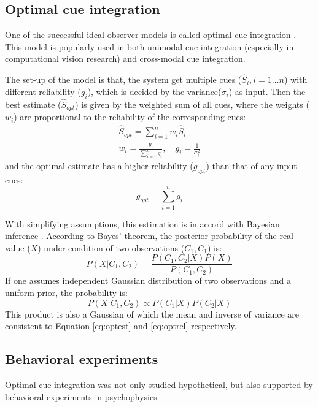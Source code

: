 \documentclass{article}[11pt]
\begin{document}
\subsection{Optimal cue integration}
One of the successful ideal observer models is called optimal cue integration \cite{geisler_contributions_2011}. This model is popularly used in both unimodal cue integration (especially in computational vision research) and cross-modal cue integration.

The set-up of the model is that, the system get multiple cues ($\hat{S}_i, i=1 \dots n$) with different reliability ($g_i$), which is decided by the variance($\sigma_i$) as input. Then the best estimate ($\hat{S}_{opt}$) is given by the weighted sum of all cues, where the weights ($w_i$) are proportional to the reliability of the corresponding cues:
\begin{gather}
  \hat{S}_{opt} = \sum_{i=1}^{n} w_i \hat{S}_i \label{eq:optest} \\
  w_i = \frac{g_i}{\sum_{i=1}^{n} g_i}, \quad g_i = \frac{1}{\sigma_i^2} \label{eq:optweight}
\end{gather}
and the optimal estimate has a higher reliability ($g_{opt}$) than that of any input cues:
\begin{equation}
  g_{opt} = \sum_{i=1}^{n} g_i \label{eq:optrel}
\end{equation}

With simplifying assumptions, this estimation is in accord with Bayesian inference \cite{knill_bayesian_2004}. According to Bayes' theorem, the posterior probability of the real value ($X$) under condition of two observations ($C_1, C_1$) is:
\begin{equation}
  P(X|C_1,C_2) = \frac{P(C_1,C_2|X)P(X)}{P(C_1,C_2)}
\end{equation}
If one assumes independent Gaussian distribution of two observations and a uniform prior, the probability is:
\begin{equation}
  P(X|C_1,C_2) \propto P(C_1|X)P(C_2|X)
\end{equation}
This product is also a Gaussian of which the mean and inverse of variance are consistent to Equation \ref{eq:optest} and \ref{eq:optrel} respectively.

\subsection{Behavioral experiments}
Optimal cue integration was not only studied hypothetical, but also supported by behavioral experiments in psychophysics \cite{alais_ventriloquist_2004}.
\end{document}
